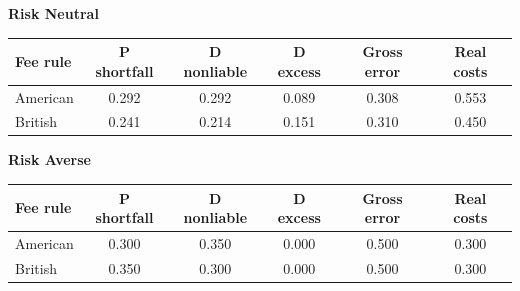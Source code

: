 \documentclass[10pt,border=5pt,varwidth=17cm]{standalone}
\begin{document}
\begingroup
\small
\setlength{\tabcolsep}{5pt}
\renewcommand{\arraystretch}{1.20}
\noindent\textbf{Risk Neutral}\par\smallskip
\noindent\begin{tabularx}{\linewidth}{@{}>{\raggedright\arraybackslash}Xccccc@{}}
\toprule
\textbf{Fee rule} & \textbf{P shortfall} & \textbf{D nonliable} & \textbf{D excess} & \textbf{Gross error} & \textbf{Real costs} \\
\midrule
American & 0.292 & 0.292 & 0.089 & 0.308 & 0.553 \\
British & 0.241 & 0.214 & 0.151 & 0.310 & 0.450 \\
\bottomrule\end{tabularx}\par\medskip
\noindent\textbf{Risk Averse}\par\smallskip
\noindent\begin{tabularx}{\linewidth}{@{}>{\raggedright\arraybackslash}Xccccc@{}}
\toprule
\textbf{Fee rule} & \textbf{P shortfall} & \textbf{D nonliable} & \textbf{D excess} & \textbf{Gross error} & \textbf{Real costs} \\
\midrule
American & 0.300 & 0.350 & 0.000 & 0.500 & 0.300 \\
British & 0.350 & 0.300 & 0.000 & 0.500 & 0.300 \\
\bottomrule\end{tabularx}\par\medskip
\endgroup
\end{document}
